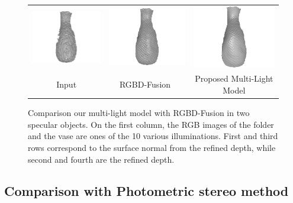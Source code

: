 \begin{figure}[!ht]
{\begin{tabular}{c|c c}
   \includegraphics[height = 0.24\linewidth]{figures/result/robust_vase_shape_init.pdf} 
   &
   \includegraphics[height = 0.24\linewidth]{figures/result/rgbd_vase_shape.pdf} &
   \includegraphics[height = 0.24\linewidth]{figures/result/robust_vase_shape.pdf}\\


   {Input} & {RGBD-Fusion~\cite{or2015rgbd}} & {Proposed Multi-Light Model}               
 \end{tabular}}
\caption{Comparison our multi-light model with RGBD-Fusion in two specular objects. On the first column, the RGB images of the folder and the vase are ones of  the 10 various illuminations. First and third rows correspond to the surface normal from the refined depth, while second and fourth are the refined depth.}
\label{fig:comp_complicated_albedo}
\end{figure}

\subsection{Comparison with Photometric stereo method}





